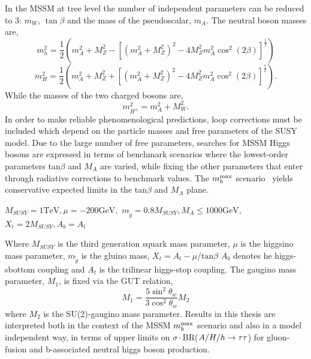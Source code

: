 In the MSSM at tree level the number of independent parameters can be reduced to 3: $m_{W}$,
$\tan{\beta}$ and the mass of the pseudoscalar, $m_{A}$. The neutral boson masses are,
\begin{equation}
m_{h}^{2}=\frac{1}{2}\left(m_{A}^{2}+M_{Z}^{2}-\left[(m_{A}^{2}+
M_{Z}^{2})^{2}-4M_{Z}^{2}m_{A}^{2}\cos^{2}{(2\beta)}\right]^{\frac{1}{2}}\right)
\end{equation}
\nobreak
\begin{equation}
m_{H}^{2}=\frac{1}{2}\left(m_{A}^{2}+M_{Z}^{2}+\left[(m_{A}^{2}+
M_{Z}^{2})^{2}-4M_{Z}^{2}m_{A}^{2}\cos^{2}{(2\beta)}\right]^{\frac{1}{2}}\right).
\end{equation}
While the masses of the two charged bosons are,
\begin{equation}
m_{H^{\pm}}^{2}=m_{A}^{2}+M_{W}^{2}.
\end{equation}
In order to make reliable phenomenological predictions, loop corrections must be included
which depend on the particle masses and free parameters of the SUSY model.
Due to the large number of free parameters,
searches for MSSM Higgs bosons are expressed in terms of benchmark scenarios where 
the lowest-order parameters tan$\beta$ and $M_A$ are varied, while fixing the other parameters that 
enter through radiative corrections to benchmark values. 
The $m_{h}^{\rm max}$ scenario~\cite{MHMAX-Carena,MHMAX-Carena-2002}
yields conservative expected limits in the tan$\beta$ and $M_A$ plane. %
\begin{center}
$
M_{SUSY} = 1 \mathrm{TeV}, 
\mu=-200 \mathrm{GeV}, 
$
\linebreak[4]
$
m_{\tilde{g}}=0.8 M_{SUSY}, 
M_{A} \leq 1000 \mathrm{GeV}, 
$
\linebreak[4]
$
X_{t}=2M_{SUSY}, 
A_{b} = A_{t}
$
\end{center}
Where 
$M_{SUSY}$ is the third generation squark mass parameter,
$\mu$ is the higgsino mass parameter,
$m_{\tilde{g}}$ is the gluino mass,
$X_{t}= A_{t}-\mu/\mathrm{tan}\beta$
$A_{b}$ denotes he higgs-sbottom coupling and
$A_{t}$ is the trilinear higgs-stop coupling.
The gaugino mass parameter, $M_{1}$, is fixed via the GUT relation,
\begin{equation} 
M_{1}=\frac{5\sin^{2}{\theta_{w}}}{3\cos^{2}{\theta_{w}}}M_{2}
\end{equation}
where $M_{2}$ is the SU(2)-gaugino mass parameter.
Results in this thesis are interpreted both in the context of the MSSM 
$m_{h}^{\rm max}$ scenario and also in a model independent way, 
in terms of upper limits on $\sigma\cdot$BR($A\slash H\slash h\rightarrow\mathrm{\tau}\mathrm{\tau}$) for 
gluon-fusion and b-associated neutral higgs boson production.


